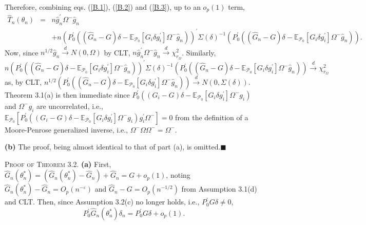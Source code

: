 \documentclass[hidelinks, 11 pt, a4paper, pdflatex]{article}
\begin{document}
{   Therefore, combining eqs. (\ref{B.1}), (\ref{B.2}) and (\ref{B.3}), up to an $o_{p}(1)$ term,
    \begin{eqnarray*}
     \hat{T}_{n}(\theta _{n}) & = & n\hat{g}_{n}^{\prime}\Omega^{-}\hat{g}_{n} \\
                              &   & + n(P_{0}^{\prime}((\hat{G}_{n} - G)\delta 
                                     - \mathbb{E}_{\mathcal{P}_{0}}[G_{i}\delta g_{i}^{\prime}]\Omega^{-}\hat{g}_{n}))^{\prime}
                                     \Sigma(\delta)^{-1}
                                      (P_{0}^{\prime}((\hat{G}_{n} - G)\delta - \mathbb{E}_{\mathcal{P}_{0}}[G_{i}\delta g_{i}^{\prime}]\Omega^{-}\hat{g}_{n})).
    \end{eqnarray*}%
   Now, since $n^{1/2}\hat{g}_{n} \overset{d} {\rightarrow} N(0,\Omega)$ by CLT, $n\hat{g}_{n}^{\prime}\Omega^{-}\hat{g}_{n} \overset{d} {\rightarrow} \chi_{r_{\Omega}}^{2}$. Similarly,
    \[
     n(P_{0}^{\prime}((\hat{G}_{n} - G)\delta - \mathbb{E}_{\mathcal{P}_{0}}[G_{i}\delta g_{i}^{\prime}]\Omega^{-}\hat{g}_{n}))^{\prime}
      \Sigma(\delta)^{-1}
      (P_{0}^{\prime}((\hat{G}_{n} - G)\delta - \mathbb{E}_{\mathcal{P}_{0}}[G_{i}\delta g_{i}^{\prime}]\Omega^{-}\hat{g}_{n}))
     \overset{d} {\rightarrow} \chi_{\bar{r}_{\Omega}}^{2}
    \]
   as, by CLT, $n^{1/2}(P_{0}^{\prime}((\hat{G}_{n} - G)\delta - \mathbb{E}_{\mathcal{P}_{0}}[G_{i}\delta g_{i}^{\prime}]\Omega^{-}\hat{g}_{n})) \overset{d} \rightarrow N(0,\Sigma(\delta))$. Theorem 3.1(a) is then immediate since $P_{0}^{\prime}((G_{i} - G)\delta - \mathbb{E}_{\mathcal{P}_{0}}[G_{i}\delta g_{i}^{\prime}]\Omega^{-}g_{i})$ and $\Omega^{-}g_{i}$ are uncorrelated, i.e., $\mathbb{E}_{\mathcal{P}_{0}}[P_{0}^{\prime}((G_{i} - G)\delta - \mathbb{E}_{\mathcal{P}_{0}}[G_{i}\delta g_{i}^{\prime}]\Omega ^{-}g_{i})g_{i}^{\prime}\Omega^{-}] = 0$ from the definition of a Moore-Penrose generalized inverse, i.e., $\Omega^{-}\Omega\Omega^{-} = \Omega^{-}$.

  \textbf{(b)} The proof, being almost identical to that of part (a), is omitted.$\blacksquare$

  \textsc{Proof of Theorem 3.2}. \textbf{(a)} First, $\hat{G}_{n}(\theta_{n}^{\ast}) = (\hat{G}_{n}(\theta_{n}^{\ast})
   - \hat{G}_{n}) + \hat{G}_{n} = G + o_{p}(1)$, noting $\hat{G}_{n}(\theta_{n}^{\ast}) - \hat{G}_{n} = O_{p}(n^{-\varepsilon})$ and $\hat{G}_{n} - G = O_{p}(n^{-1/2})$ from Assumption 3.1(d) and CLT. Then, since Assumption 3.2(c) no longer holds, i.e., $P_{0}^{\prime}G\delta \neq 0$,
    \[
     P_{0}^{\prime}\hat{G}_{n}(\theta_{n}^{\ast})\delta_{n} = P_{0}^{\prime}G\delta + o_{p}(1).
    \]

}
\end{document}

